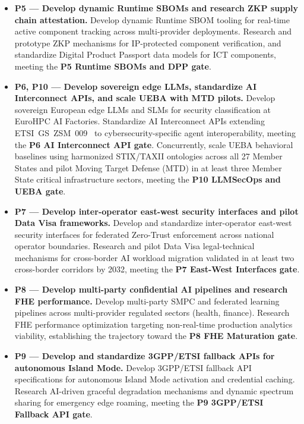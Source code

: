\documentclass{ieeeaccess}
\begin{document}
\begin{itemize}
    \item \textbf{P5 --- Develop dynamic Runtime SBOMs and research
    ZKP supply chain attestation.}
    Develop dynamic Runtime SBOM tooling for real-time active component
    tracking across multi-provider deployments. Research and prototype
    ZKP mechanisms for IP-protected component verification, and
    standardize Digital Product Passport data models for ICT
    components, meeting the
    \textbf{P5 Runtime SBOMs and DPP gate}.

    \item \textbf{P6, P10 --- Develop sovereign edge LLMs, standardize
    AI Interconnect APIs, and scale UEBA with MTD pilots.}
    Develop sovereign European edge LLMs and SLMs for security
    classification at EuroHPC AI Factories. Standardize AI Interconnect
    APIs extending ETSI~GS~ZSM~009~\cite{etsi_zsm009} to
    cybersecurity-specific agent interoperability, meeting the
    \textbf{P6 AI Interconnect API gate}. Concurrently, scale UEBA
    behavioral baselines using harmonized STIX/TAXII ontologies across
    all 27 Member States and pilot Moving Target Defense (MTD) in at
    least three Member State critical infrastructure sectors, meeting
    the \textbf{P10 LLMSecOps and UEBA gate}.

    \item \textbf{P7 --- Develop inter-operator east-west security
    interfaces and pilot Data Visa frameworks.}
    Develop and standardize inter-operator east-west security
    interfaces for federated Zero-Trust enforcement across national
    operator boundaries. Research and pilot Data Visa legal-technical
    mechanisms for cross-border AI workload migration validated in at
    least two cross-border corridors by 2032, meeting the
    \textbf{P7 East-West Interfaces gate}.

    \item \textbf{P8 --- Develop multi-party confidential AI pipelines
    and research FHE performance.}
    Develop multi-party SMPC and federated learning pipelines across
    multi-provider regulated sectors (health, finance). Research FHE
    performance optimization targeting non-real-time production
    analytics viability, establishing the trajectory toward the
    \textbf{P8 FHE Maturation gate}.

    \item \textbf{P9 --- Develop and standardize 3GPP/ETSI fallback
    APIs for autonomous Island Mode.}
    Develop 3GPP/ETSI fallback API specifications for autonomous Island
    Mode activation and credential caching. Research AI-driven
    graceful degradation mechanisms and dynamic spectrum sharing for
    emergency edge roaming, meeting the
    \textbf{P9 3GPP/ETSI Fallback API gate}.

\end{itemize}
\end{document}
